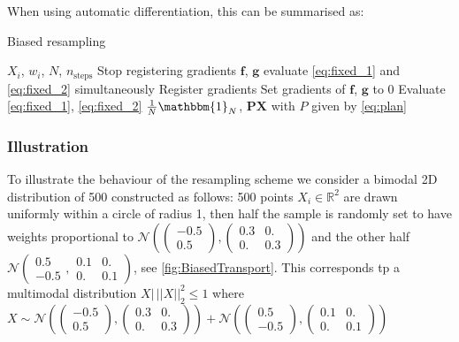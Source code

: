 \documentclass[]{article}
\begin{document}
		When using automatic differentiation, this can be summarised as:
		\begin{algorithm}
			\caption{Biased resampling}
			\label{algo:biasedResampling}
			\begin{algorithmic}
				 $X_i$, $w_i$, $N$, $n_{\text{steps}}$
				\STATE Stop registering gradients
				 $\mathbf{f}$, $\mathbf{g}$
				\STATE 
						\STATE evaluate \cref{eq:fixed_1} and \cref{eq:fixed_2} simultaneously
					\ENDFOR
				\STATE Register gradients
				\STATE Set gradients of $\mathbf{f}$, $\mathbf{g}$ to $0$
				\STATE Evaluate \cref{eq:fixed_1}, \cref{eq:fixed_2}
				\OUTPUT $\frac 1 N \mathbbm{1}_N$, $\mathbf{P} \mathbf{X}$ with $P$ given by \cref{eq:plan}
			\end{algorithmic}
		\end{algorithm}
		
		
		
		\subsubsection{Illustration}
			To illustrate the behaviour of the resampling scheme we consider a bimodal 2D distribution of 500 constructed as follows: 500 points $X_i \in \mathbb{R}^2$ are drawn uniformly within a circle of radius 1, then half the sample is randomly set to have weights proportional to $\mathcal{N}\left(\left(\begin{matrix}-0.5 \\ 0.5\end{matrix}\right), \left(\begin{matrix}0.3 & 0.\\ 0. & 0.3 \end{matrix}\right)\right)$ and the other half $\mathcal{N}\left(\begin{matrix}0.5 \\ -0.5\end{matrix}, \begin{matrix}0.1 & 0.\\ 0. & 0.1 \end{matrix}\right)$, see \cref{fig:BiasedTransport}. This corresponds tp a multimodal distribution $X |\, ||X||^2_2 \leq 1$ where $X\sim \mathcal{N}\left(\left(\begin{matrix}-0.5 \\ 0.5\end{matrix}\right), \left(\begin{matrix}0.3 & 0.\\ 0. & 0.3 \end{matrix}\right)\right) + \mathcal{N}\left(\left(\begin{matrix}0.5 \\ -0.5\end{matrix}\right), \left(\begin{matrix}0.1 & 0.\\ 0. & 0.1 \end{matrix}\right)\right)$
			
\end{document}

